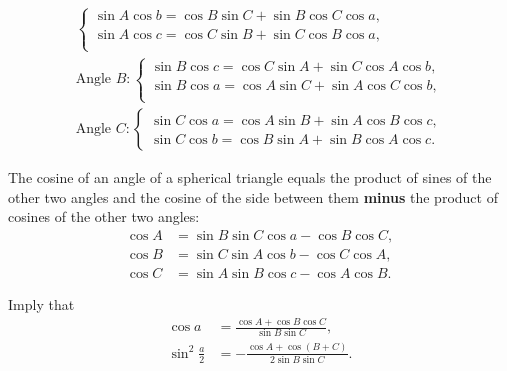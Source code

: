 \begin{tcolorbox}[title={Five--Piece Spherical Trigonometric Identities}]
\begin{question}[name=Angle's Sine Times Adjacent Side's Cosine]
\begin{align*}
\begin{cases}
            \sin A \cos b = \cos B \sin C + \sin B \cos C \cos a,\\
            \sin A \cos c = \cos C \sin B + \sin C \cos B \cos a,\\ 
        \end{cases}\\
        \text{Angle } B: \begin{cases}
            \sin B \cos c = \cos C \sin A + \sin C \cos A \cos b,\\
            \sin B \cos a = \cos A \sin C + \sin A \cos C \cos b,\\
        \end{cases}\\
        \text{Angle } C: \begin{cases}
            \sin C \cos a = \cos A \sin B + \sin A \cos B \cos c,\\
            \sin C \cos b = \cos B \sin A + \sin B \cos A \cos c.
        \end{cases}
        \end{align*}
    \end{question}
\end{tcolorbox}

\begin{tcolorbox}[title={Spherical Law of Cosines for Angles}]
    \begin{question}
        The cosine of an angle of a spherical triangle equals the product of sines of the other two angles and the cosine of the side between them \textbf{minus} the product of cosines of the other two angles:
    \begin{align*}
        \cos A &= \sin B \sin C \cos a - \cos B \cos C,\\
        \cos B &= \sin C \sin A \cos b - \cos C \cos A,\\
        \cos C &= \sin A \sin B \cos c - \cos A \cos B.
    \end{align*}
    \end{question}
    \begin{question}
        Imply that
        \begin{align*}
            \cos a &= \frac{\cos A + \cos B\cos C}{\sin B \sin C},\\
            \sin^2\frac{a}{2} &= -\frac{\cos A + \cos(B+C)}{2\sin B \sin C}. 
        \end{align*}
    \end{question}
\end{tcolorbox}


